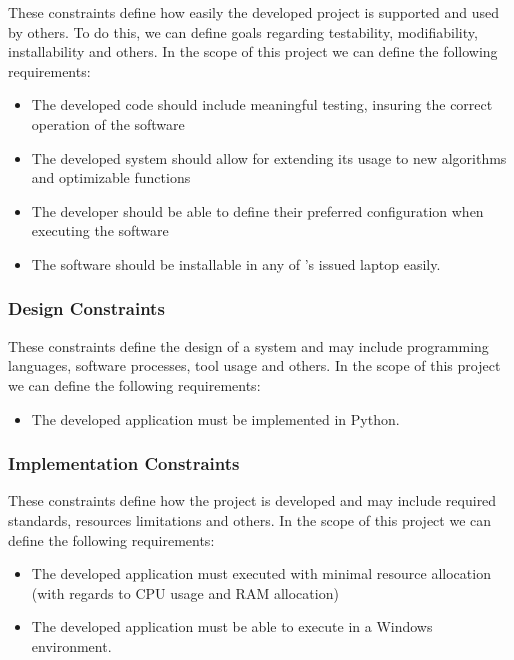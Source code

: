 These constraints define how easily the developed project is supported and used by others. To do this, we can define goals regarding testability, modifiability, installability and others. In the scope of this project we can define the following requirements:

\begin{itemize}
	\item The developed code should include meaningful testing, insuring the correct operation of the software
	\item The developed system should allow for extending its usage to new algorithms and optimizable functions
	\item The developer should be able to define their preferred configuration when executing the software
	\item The software should be installable in any of \faro's issued laptop easily.
\end{itemize}

\subsubsection{Design Constraints}

These constraints define the design of a system and may include programming languages, software processes, tool usage and others. In the scope of this project we can define the following requirements:

\begin{itemize}
	\item The developed application must be implemented in Python.
\end{itemize}

\subsubsection{Implementation Constraints} 

These constraints define how the project is developed and may include required standards, resources limitations and others. In the scope of this project we can define the following requirements:

\begin{itemize}
	\item The developed application must executed with minimal resource allocation (with regards to CPU usage and RAM allocation)
	\item The developed application must be able to execute in a Windows environment.
\end{itemize}

